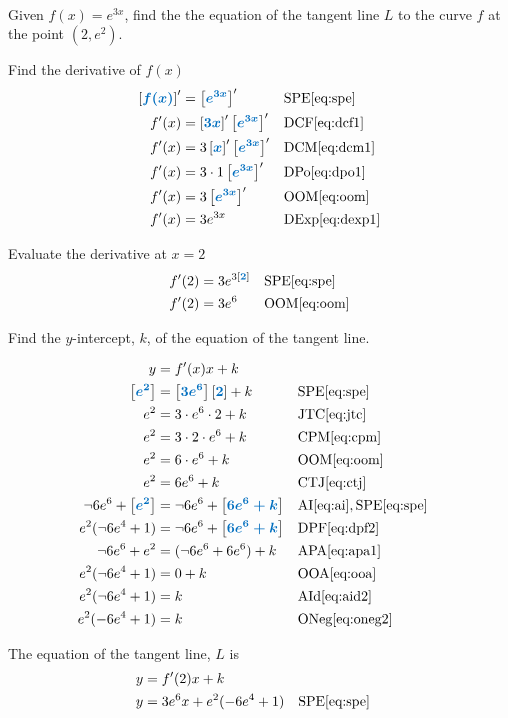 \documentclass[20150903-160354-rs2.2-MarksMathNotebook.tex]{subfiles}
\begin{document}
\begin{example}[id:20151015-171630] \label{20151015-171630} \hfill \\
Given $f(x)=e^{3x}$, find the the equation of the tangent line $L$ to the curve $f$ at the point $(2, e^2)$.

\soln

\solnsteps

Find the derivative of $f(x)$
\begin{align*}
\farg{f(x)}' &= \farg{e^{3x}}' && \text{SPE} \eqref{eq:spe} \\
f'(x) &= \farg{3x}' \farg{e^{3x}}' && \text{DCF} \eqref{eq:dcf1} \\
f'(x) &= 3\farg{x}'  \farg{e^{3x}}' && \text{DCM} \eqref{eq:dcm1} \\
f'(x) &= 3 \cdot 1 \farg{e^{3x}}' && \text{DPo} \eqref{eq:dpo1} \\
f'(x) &= 3 \farg{e^{3x}}' && \text{OOM} \eqref{eq:oom} \\
f'(x) &= 3 e^{3x} && \text{DExp} \eqref{eq:dexp1} 
\end{align*}

Evaluate the derivative at $x=2$
\begin{align*}
f'(2) & = 3 e^{3\farg{2}} && \text{SPE} \eqref{eq:spe} \\
f'(2) & = 3 e^{6} && \text{OOM} \eqref{eq:oom} \\
\end{align*}

Find the $y$-intercept, $k$, of the equation of the tangent line.

\begin{align*}
y &= f'(x)x + k\\ 
\farg{e^2} &= \farg{3 e^{6}} \farg{2} + k && \text{SPE} \eqref{eq:spe} \\
e^2 &= 3 \cdot e^{6} \cdot 2 + k && \text{JTC} \eqref{eq:jtc} \\
e^2 &= 3 \cdot 2 \cdot e^{6} + k && \text{CPM} \eqref{eq:cpm} \\
e^2 &= 6 \cdot e^6 + k && \text{OOM} \eqref{eq:oom} \\
e^2 &= 6e^6 + k && \text{CTJ} \eqref{eq:ctj} \\
\neg 6e^6 + \farg{e^2}  &= \neg 6e^6 + \farg{6e^6 + k}  && \text{AI} \eqref{eq:ai},\text{SPE} \eqref{eq:spe}  \\
e^2(\neg 6 e^4 + 1) &= \neg 6e^6 + \farg{6e^6 + k} && \text{DPF} \eqref{eq:dpf2} \\
\neg 6e^6 + e^2  &= (\neg 6e^6 + 6e^6) + k && \text{APA} \eqref{eq:apa1} \\
e^2(\neg 6 e^4 + 1) &=  0 + k && \text{OOA} \eqref{eq:ooa} \\
e^2(\neg 6 e^4 + 1) &= k && \text{AId} \eqref{eq:aid2}\\
e^2(-6 e^4 + 1) &= k && \text{ONeg} \eqref{eq:oneg2} 
\end{align*}

The equation of the tangent line, $L$ is
\begin{align*}
y & = f'(2)x+k \\
y &= 3 e^{6}x + e^2(-6 e^4 + 1) && \text{SPE} \eqref{eq:spe} 
\end{align*}
\end{example}
\end{document}
